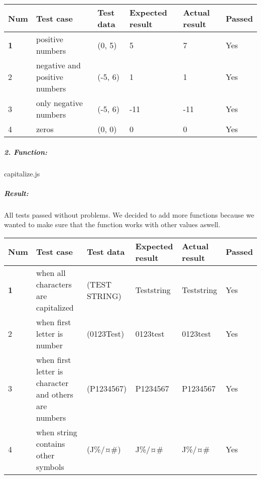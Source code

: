 \documentclass[a4paper, 12pt]{article}
\begin{document}
		\begin{table}[h!]
        	\begin{tabular}{|l|p{3cm}|p{2cm}|p{2cm}|p{2.5cm}|l|}
        		\hline
        		Num & Test case        					& Test data 					& Expected result 					& Actual result 		& Passed            \\ \hline
        		\textbf{1}   & positive numbers 					& (0, 5)     					& 5               					& 7             		& Yes   \\ \hline
        		2            & negative and positive numbers			& (-5, 6)    					& 1               					& 1             		& Yes   \\ \hline
        		3            & only negative numbers			        & (-5, 6)    					& -11               				& -11             		& Yes   \\ \hline
        		4            & zeros			                        & (0, 0)    					& 0               				    & 0             		& Yes   \\ \hline
            \end{tabular}
        \end{table}
		
		\newpage
		\hypertarget{header-n50}{%
		\subparagraph{2. Function:}\label{header-n50}}
		
		capitalize.js
		
		\hypertarget{header-n70}{%
		\subparagraph{\texorpdfstring{Result: }{Result: }}\label{header-n70}}
		
		All tests passed without problems. We decided to add more functions
		because we wanted to make sure that the function works with other values
		aswell.
		
		\begin{table}[h!]
        	\begin{tabular}{|l|p{3cm}|p{2cm}|p{2cm}|p{2.5cm}|l|}
        		\hline
        		Num & Test case        					                                        & Test data 					    & Expected result 					& Actual result 		& Passed \\ \hline
        		\textbf{1}      & when all characters are capitalized 		                    & (TEST STRING)     					& Teststring            			& Teststring            & Yes     \\ \hline
        		2               & when first letter is number 		                            & (0123Test)     					    & 0123test           		    	& 0123test              & Yes     \\ \hline
        		3               & when first letter is character and others are numbers 		& (P1234567)     					    & P1234567           			    & P1234567              & Yes     \\ \hline
        		4               & when string contains other symbols 		                    & (J\%/¤#)   					        & J\%/¤#             			    & J\%/¤#                & Yes     \\ \hline
        	\end{tabular}
        \end{table}
		
\end{document}
